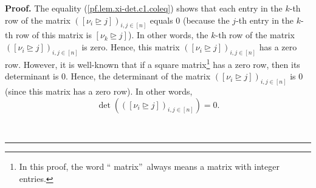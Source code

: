 \documentclass
[numbers=enddot,12pt,final,onecolumn,notitlepage,english]{scrartcl}%
\theoremstyle{definition}
\newenvironment{proof}[1][Proof]{\noindent\textbf{#1.} }{\ \rule{0.5em}{0.5em}}
\newenvironment{verlong}{}{}
\begin{document}
\begin{proof}
\begin{verlong}
The equality (\ref{pf.lem.xi-det.c1.coleq}) shows that each entry in the
$k$-th row of the matrix $\left(  \left[  \nu_{i}\trianglerighteq j\right]
\right)  _{i,j\in\left[  n\right]  }$ equals $0$ (because the $j$-th entry in
the $k$-th row of this matrix is $\left[  \nu_{k}\trianglerighteq j\right]
$). In other words, the $k$-th row of the matrix $\left(  \left[  \nu
_{i}\trianglerighteq j\right]  \right)  _{i,j\in\left[  n\right]  }$ is zero.
Hence, this matrix $\left(  \left[  \nu_{i}\trianglerighteq j\right]  \right)
_{i,j\in\left[  n\right]  }$ has a zero row. However, it is well-known that if
a square matrix\footnote{In this proof, the word \textquotedblleft
matrix\textquotedblright\ always means a matrix with integer entries.} has a
zero row, then its determinant is $0$. Hence, the determinant of the matrix
$\left(  \left[  \nu_{i}\trianglerighteq j\right]  \right)  _{i,j\in\left[
n\right]  }$ is $0$ (since this matrix has a zero row). In other words,
\begin{equation}
\det\left(  \left(  \left[  \nu_{i}\trianglerighteq j\right]  \right)
_{i,j\in\left[  n\right]  }\right)  =0. \label{pf.lem.xi-det.c1.det=0}%
\end{equation}



\end{verlong}
\end{proof}
\end{document}
